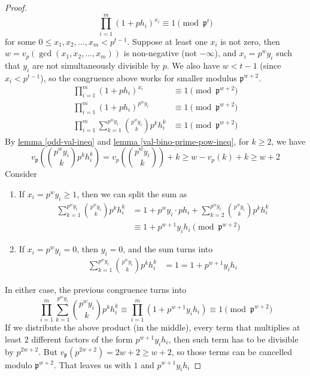 \documentclass{treatise}
\begin{document}
\begin{proof}
$$\prod_{i = 1}^m (1 + p h_i)^{x_i} \equiv 1 \pmod{\mathfrak{p}^t}$$
for some $0 \leq x_1, x_2, \hdots, x_m < p^{t - 1}$. Suppose at least one $x_i$ is not zero, then $w = v_p(\gcd(x_1, x_2, \hdots, x_m))$ is non-negative (not $-\infty$), and $x_i = p^w y_i$ such that $y_i$ are not simultaneously divisible by $p$. We also have $w < t - 1$ (since $x_i < p^{t - 1}$), so the congruence above works for smaller modulus $\mathfrak{p}^{w + 2}$.
\begin{align*}
\prod_{i = 1}^m (1 + p h_i)^{x_i} & \equiv 1 \pmod{\mathfrak{p}^{w + 2}} \\
\prod_{i = 1}^m (1 + p h_i)^{p^w y_i} & \equiv 1 \pmod{\mathfrak{p}^{w + 2}} \\
\prod_{i = 1}^m \sum_{k = 1}^{p^w y_i} {p^w y_i \choose k} p^k h_i^k & \equiv 1 \pmod{\mathfrak{p}^{w + 2}}
\end{align*}
By \hyperref[odd-val-ineq]{lemma \ref*{odd-val-ineq}} and \hyperref[val-bino-prime-pow-ineq]{lemma \ref*{val-bino-prime-pow-ineq}}, for $k \geq 2$, we have
$$v_\mathfrak{p} \left( {p^w y_i \choose k} p^k h_i^k \right) = v_p \left( {p^w y_i \choose k} \right) + k \geq w - v_p(k) + k \geq w + 2$$
Consider
\begin{enumerate}
	\item If $x_i = p^w y_i \geq 1$, then we can split the sum as
	\begin{align*}
	\sum_{k = 1}^{p^w y_i} {p^w y_i \choose k} p^k h_i^k & = 1 + p^w y_i \cdot p h_i + \sum_{k = 2}^{p^w y_i} {p^w y_i \choose k} p^k h_i^k \\
	& \equiv 1 + p^{w + 1} y_i h_i \pmod{\mathfrak{p}^{w + 2}}
	\end{align*}
	\item If $x_i = p^w y_i = 0$, then $y_i = 0$, and the sum turns into
	\begin{align*}
	\sum_{k = 1}^{p^w y_i} {p^w y_i \choose k} p^k h_i^k & = 1 = 1 + p^{w + 1} y_i h_i
	\end{align*}
\end{enumerate}
In either case, the previous congruence turns into
$$\prod_{i = 1}^m \sum_{k = 1}^{p^w y_i} {p^w y_i \choose k} p^k h_i^k \equiv \prod_{i = 1}^m \left( 1 + p^{w + 1} y_i h_i \right) \equiv 1 \pmod{\mathfrak{p}^{w + 2}}$$
If we distribute the above product (in the middle), every term that multiplies at least 2 different factors of the form $p^{w + 1} y_i h_i$, then such term has to be divisible by $p^{2w + 2}$. But $v_\mathfrak{p} (p^{2w + 2}) = 2w + 2 \geq w + 2$, so those terms can be cancelled modulo $\mathfrak{p}^{w + 2}$. That leaves us with $1$ and $p^{w + 1} y_i h_i$

\end{proof}
\end{document}
